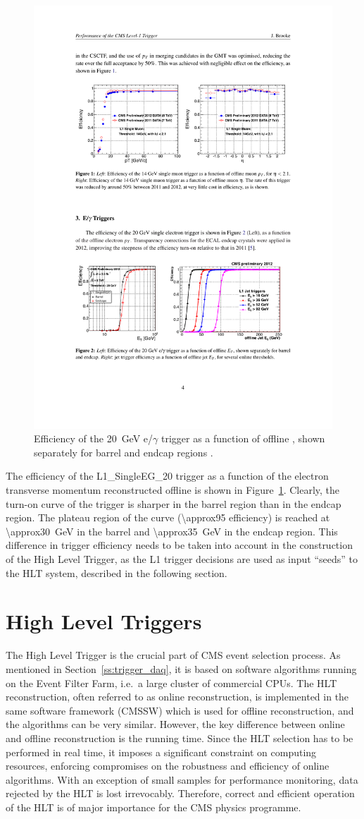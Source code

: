 \begin{figure}[!htbp]
  \centering
  \leavevmode
  \includegraphics[width=0.5\columnwidth]{L1_turnon}
  \caption[Efficiency of the \SI{20}{\GeV} e/$\gamma$ trigger]{Efficiency of the \SI{20}{\GeV} e/$\gamma$ trigger as a
  function of offline \ET, shown separately for barrel and endcap regions \autocite{L1_Brooke}.}
  \label{fig:L1_seed_turn_on_curve}
\end{figure}

The efficiency of the L1\_SingleEG\_20 trigger as a function of the electron transverse momentum reconstructed offline
is shown in Figure~\ref{fig:L1_seed_turn_on_curve}. Clearly, the turn-on curve of the trigger is sharper in the barrel
region than in the endcap region. The plateau region of the curve (\SI{\approx95}{\pc} efficiency) is reached at
\SI{\approx30}{\GeV} in the barrel and \SI{\approx35}{\GeV} in the endcap region. This difference in trigger efficiency
needs to be taken into account in the construction of the High Level Trigger, as the L1 trigger decisions are used as
input ``seeds'' to the HLT system, described in the following section.

\section{High Level Triggers}
\label{s:hlt_for_top_physics}
The High Level Trigger \autocite{HLT} is the crucial part of CMS event selection process. As mentioned in
Section~\ref{ss:trigger_daq}, it is based on software algorithms running on the Event Filter Farm, i.e.\ a large cluster
of commercial CPUs. The HLT reconstruction, often referred to as online reconstruction, is implemented in the same
software framework (CMSSW) which is used for offline reconstruction, and the algorithms can be very similar. However,
the key difference between online and offline reconstruction is the running time. Since the HLT selection has to be
performed in real time, it imposes a significant constraint on computing resources, enforcing compromises on the
robustness and efficiency of online algorithms. With an exception of small samples for performance monitoring, data
rejected by the HLT is lost irrevocably. Therefore, correct and efficient operation of the HLT is of major importance
for the CMS physics programme.

